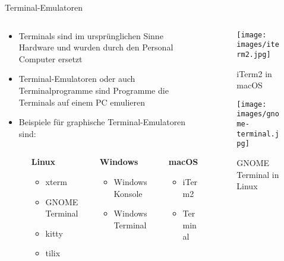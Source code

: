 \begin{frame}{Terminal-Emulatoren}
  \begin{columns}
    \begin{column}{0.5\textwidth}
      \begin{itemize}
        \item Terminals sind im ursprünglichen Sinne Hardware und wurden durch den Personal Computer ersetzt
        \item Terminal-Emulatoren oder auch Terminalprogramme sind Programme die Terminals auf einem PC emulieren
        \item Beispiele für graphische Terminal-Emulatoren sind:
        \begin{columns}[t, onlytextwidth]
          \begin{column}{0.1\textwidth}
          \end{column}
          \begin{column}{0.3\textwidth}
          \textbf{Linux}
          \begin{itemize}
              \item xterm
              \item GNOME Terminal
              \item kitty
              \item tilix
          \end{itemize}
          \end{column}
          \hfill
          \begin{column}{0.3\textwidth}
          \textbf{Windows}
          \begin{itemize}
              \item Windows Konsole
              \item Windows Terminal
          \end{itemize}
          \end{column}
          \hfill
          \begin{column}{0.3\textwidth}
          \textbf{macOS}
          \begin{itemize}
              \item iTerm2
              \item Terminal
          \end{itemize}
          \end{column}
          \end{columns}
      \end{itemize}
    \end{column}
    \begin{column}{0.5\textwidth}
      \begin{figure}
        \texttt{[image: images/iterm2.jpg]}
      \caption*{iTerm2 in macOS}
      \end{figure}
      \begin{figure}
        \texttt{[image: images/gnome-terminal.jpg]}
      \caption*{GNOME Terminal in Linux}
      \end{figure}
    \end{column}
  \end{columns}
  
\end{frame}


